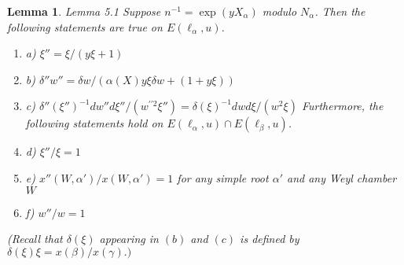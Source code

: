 \documentclass{memo-l}
\newtheorem{lemma}[theorem]{Lemma}
\theoremstyle{definition}
\theoremstyle{remark}
\numberwithin{section}{chapter}
\numberwithin{equation}{chapter}
\begin{document}
\begin{lemma}{Lemma 5.1} Suppose $n^{-1} = \exp(yX_{{\alpha}})$ modulo
$N_{{\alpha}}$.  Then the following statements are true on
$E({\ell}_{{\alpha}},u)$.

\medskip
\begin{enumerate}
\item{a)} ${\xi}'' = {\xi}/(y{\xi}+1)$
\smallskip
\item{b)} ${\delta}''w'' = {\delta}w/({\alpha}(X)y{\xi}{\delta}w + (1+y{\xi}))$
\smallskip
\item{c)} ${\delta}''({\xi}'')^{-1}dw''d{\xi''}/(w^{\prime\prime2}{\xi''}) =
{\delta}({\xi})^{-1}dwd{\xi}/(w^{2}{\xi})$
\medskip
Furthermore, the following statements hold on $E({\ell}_{{\alpha}},u)
\cap E({\ell}_{{\beta}},u)$.
\smallskip        
\item{d)} ${\xi}''/{\xi} = 1$
\smallskip        
\item{e)} $x''(W,{\alpha}')/x(W,{\alpha}') = 1$ for any simple root ${\alpha}'$ and
any Weyl chamber $W$
\smallskip
\item{f)} $w''/w = 1$
\end{enumerate}
\smallskip
\noindent
(Recall that ${\delta}({\xi})$ appearing in $(b)$ and $(c)$ is defined by
${\delta}({\xi}){\xi} = x({\beta})/x({\gamma}).)$
\end{lemma}
\end{document}
